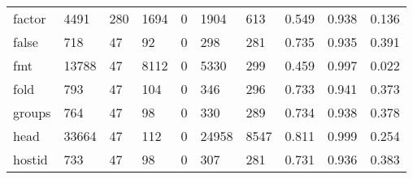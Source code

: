 \begin{longtable}{lp{1.3cm}p{1.3cm}p{1.3cm}p{1.3cm}p{1.3cm}p{1.3cm}p{1.3cm}p{1.3cm}p{1.3cm}}
factor    &                   4491 &                                280 &                              1694 &                                0 &                              1904 &                             613 &                                0.549 &                                  0.938 &                                0.136 \\
false     &                    718 &                                 47 &                                92 &                                0 &                               298 &                             281 &                                0.735 &                                  0.935 &                                0.391 \\
fmt       &                  13788 &                                 47 &                              8112 &                                0 &                              5330 &                             299 &                                0.459 &                                  0.997 &                                0.022 \\
fold      &                    793 &                                 47 &                               104 &                                0 &                               346 &                             296 &                                0.733 &                                  0.941 &                                0.373 \\
groups    &                    764 &                                 47 &                                98 &                                0 &                               330 &                             289 &                                0.734 &                                  0.938 &                                0.378 \\
head      &                  33664 &                                 47 &                               112 &                                0 &                             24958 &                            8547 &                                0.811 &                                  0.999 &                                0.254 \\
hostid    &                    733 &                                 47 &                                98 &                                0 &                               307 &                             281 &                                0.731 &                                  0.936 &                                0.383 \\

\end{longtable}
